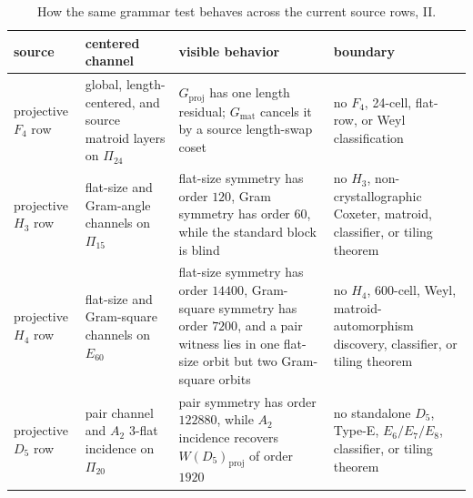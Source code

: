 \begin{table}[!htbp]
\centering
\scriptsize
\setlength{\tabcolsep}{3pt}
\renewcommand{\arraystretch}{0.86}
\caption{How the same grammar test behaves across the current source rows, II.}
\begin{tabular}{@{}L{0.16\textwidth}L{0.24\textwidth}L{0.28\textwidth}L{0.24\textwidth}@{}}
\toprule
source & centered channel & visible behavior & boundary \\
\midrule
projective \(F_4\) row & global, length-centered, and source matroid layers on \(\Pi_{24}\) & \(G_{\mathrm{proj}}\) has one length residual; \(G_{\mathrm{mat}}\) cancels it by a source length-swap coset & no \(F_4\), 24-cell, flat-row, or Weyl classification \\
projective \(H_3\) row & flat-size and Gram-angle channels on \(\Pi_{15}\) & flat-size symmetry has order \(120\), Gram symmetry has order \(60\), while the standard block is blind & no \(H_3\), non-crystallographic Coxeter, matroid, classifier, or tiling theorem \\
projective \(H_4\) row & flat-size and Gram-square channels on \(E_{60}\) & flat-size symmetry has order \(14400\), Gram-square symmetry has order \(7200\), and a pair witness lies in one flat-size orbit but two Gram-square orbits & no \(H_4\), 600-cell, Weyl, matroid-automorphism discovery, classifier, or tiling theorem \\
projective \(D_5\) row & pair channel and \(A_2\) 3-flat incidence on \(\Pi_{20}\) & pair symmetry has order \(122880\), while \(A_2\) incidence recovers \(W(D_5)_{\mathrm{proj}}\) of order \(1920\) & no standalone \(D_5\), Type-E, \(E_6/E_7/E_8\), classifier, or tiling theorem \\
\bottomrule
\end{tabular}
\end{table}

